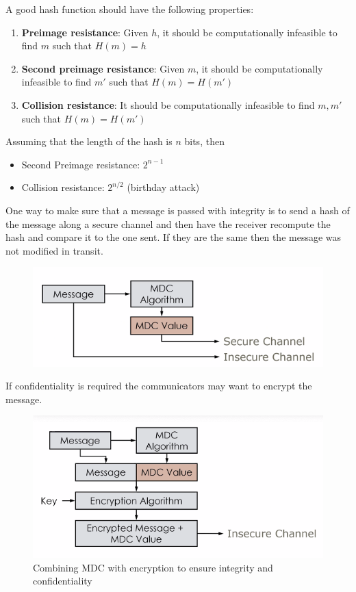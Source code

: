 \documentclass[../notes.tex]{subfiles}
\begin{document}
A good hash function should have the following properties:
\begin{enumerate}
    \item \textbf{Preimage resistance}: Given $ h $, it should be computationally infeasible to find $ m $ such that $ H(m) = h $
    \item \textbf{Second preimage resistance}: Given $ m $, it should be computationally infeasible to find $ m' $ such that $ H(m) = H(m') $
    \item \textbf{Collision resistance}: It should be computationally infeasible to find $ m, m' $ such that $ H(m) = H(m') $
\end{enumerate}

Assuming that the length of the hash is $ n $ bits, then 


\begin{itemize}
    \item Second Preimage resistance: $ 2^{n-1} $
    \item Collision resistance: $ 2^{n/2} $ (birthday attack)
\end{itemize}


One way to make sure that a message is passed with integrity is to send a hash of the message along a secure channel and then have the receiver recompute the hash and compare it to the one sent. If they are the same then the message was not modified in transit.

\begin{figure}[H]
    \centering
    \includegraphics[width=0.8\linewidth]{img/image_2023-02-13-18-39-54.png}
\end{figure}

If confidentiality is required the communicators may want to encrypt the message.


\begin{figure}[H]
    \centering
    \includegraphics[width=0.8\linewidth]{img/image_2023-02-13-18-41-31.png}
    \caption{Combining MDC with encryption to ensure integrity and confidentiality}
\end{figure}
\end{document}
